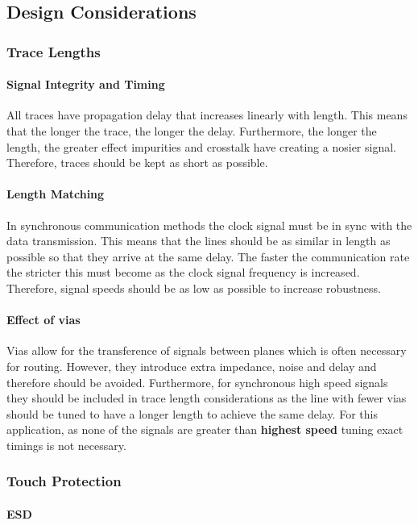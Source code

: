 \subsection{Design Considerations}

\subsubsection{Trace Lengths}
\paragraph{Signal Integrity and Timing}
All traces have propagation delay that increases linearly with length. This means that the longer the trace, the longer the delay. Furthermore, the longer the length, the greater effect impurities and crosstalk have creating a nosier signal. Therefore, traces should be kept as short as possible.
\paragraph{Length Matching}
In synchronous communication methods the clock signal must be in sync with the data transmission. This means that the lines should be as similar in length as possible so that they arrive at the same delay. The faster the communication rate the stricter this must become as the clock signal frequency is increased. Therefore, signal speeds should be as low as possible to increase robustness.
\paragraph{Effect of vias}
Vias allow for the transference of signals between planes which is often necessary for routing. However, they introduce extra impedance, noise and delay \cite{source} and therefore should be avoided. Furthermore, for synchronous high speed signals they should be included in trace length considerations as the line with fewer vias should be tuned to have a longer length to achieve the same delay. For this application, as none of the signals are greater than \textbf{highest speed} tuning exact timings is not necessary.

\subsubsection{Touch Protection}
\paragraph{\gls{ESD}}
